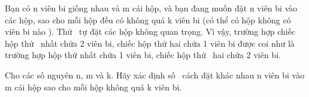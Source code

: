 Bạn có n viên bi giống nhau và m cái hộp, và bạn đang muốn đặt n viên bi vào các hộp, sao cho mỗi hộp đều có không quá k viên bi (có thể có hộp không có viên bi nào ). Thứ  tự đặt các hộp không quan trọng. Vì vậy, trường hợp chiếc hộp thứ  nhất chứa 2 viên bi, chiếc hộp thứ hai chứa 1 viên bi được coi như là trường hợp hộp thứ nhất chứa 1 viên bi, chiếc hộp thứ  hai chứa 2 viên bi.  

   Cho các số nguyên n, m và k. Hãy xác định số  cách đặt khác nhau n viên bi vào m cái hộp sao cho mỗi hộp không quá k viên bi.